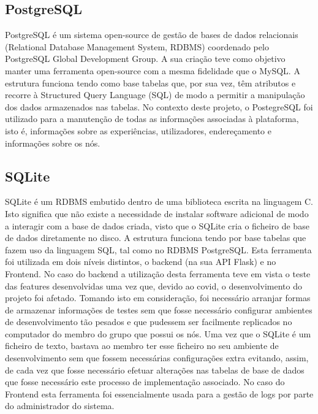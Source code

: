 \subsection{PostgreSQL}
PostgreSQL é um sistema open-source de gestão de bases de dados relacionais (Relational Database Management System, RDBMS) coordenado pelo PostgreSQL Global Development Group. A sua criação teve como objetivo manter uma ferramenta open-source com a mesma fidelidade que o MySQL.\newline
A estrutura funciona tendo como base tabelas que, por sua vez, têm atributos e recorre à Structured Query Language (SQL) de modo a permitir a manipulação dos dados armazenados nas tabelas.\newline
No contexto deste projeto, o PostegreSQL foi utilizado para a manutenção de todas as informações associadas à plataforma, isto é, informações sobre as experiências, utilizadores, endereçamento e informações sobre os nós.

\subsection{SQLite}
SQLite é um RDBMS embutido dentro de uma biblioteca escrita na linguagem C. Isto significa que não existe a necessidade de instalar software adicional de modo a interagir com a base de dados criada, visto que o SQLite cria o ficheiro de base de dados diretamente no disco. \newline
A estrutura funciona tendo por base tabelas que fazem uso da linguagem SQL, tal como no RDBMS PostgreSQL. \newline
Esta ferramenta foi utilizada em dois níveis distintos, o backend (na sua API Flask) e no Frontend. \newline
No caso do backend a utilização desta ferramenta teve em vista o teste das features desenvolvidas uma vez que, devido ao covid, o desenvolvimento do projeto foi afetado. Tomando isto em consideração, foi necessário arranjar formas de armazenar informações de testes sem que fosse necessário configurar ambientes de desenvolvimento tão pesados e que pudessem ser facilmente replicados no computador do membro do grupo que possui os nós. Uma vez que o SQLite é um ficheiro de texto, bastava ao membro ter esse ficheiro no seu ambiente de desenvolvimento sem que fossem necessárias configurações extra evitando, assim, de cada vez que fosse necessário efetuar alterações nas tabelas de base de dados que fosse necessário este processo de implementação associado. \newline
No caso do Frontend esta ferramenta foi essencialmente usada para a gestão de logs por parte do administrador do sistema.


